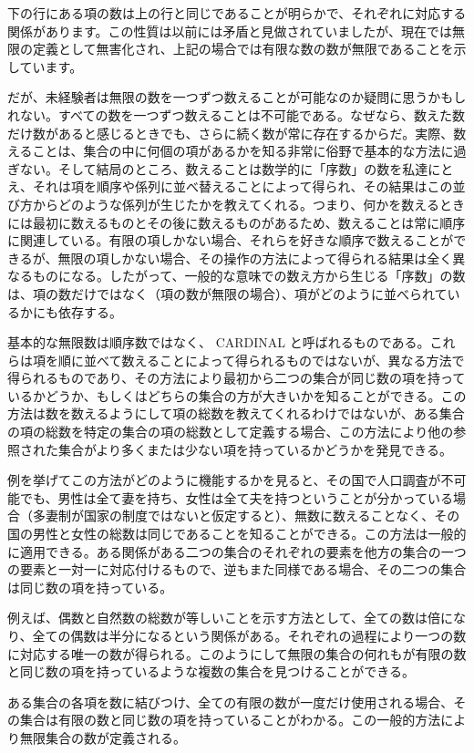 \documentclass[a4paper,11pt,openany]{ltjsbook}
\begin{document}
下の行にある項の数は上の行と同じであることが明らかで、それぞれに対応する関係があります。この性質は以前には矛盾と見做されていましたが、現在では無限の定義として無害化され、上記の場合では有限な数の数が無限であることを示しています。

だが、未経験者は無限の数を一つずつ数えることが可能なのか疑問に思うかもしれない。すべての数を一つずつ数えることは不可能である。なぜなら、数えた数だけ数があると感じるときでも、さらに続く数が常に存在するからだ。実際、数えることは、集合の中に何個の項があるかを知る非常に俗野で基本的な方法に過ぎない。そして結局のところ、数えることは数学的に「序数」の数を私達にとえ、それは項を順序や係列に並べ替えることによって得られ、その結果はこの並び方からどのような係列が生じたかを教えてくれる。つまり、何かを数えるときには最初に数えるものとその後に数えるものがあるため、数えることは常に順序に関連している。有限の項しかない場合、それらを好きな順序で数えることができるが、無限の項しかない場合、その操作の方法によって得られる結果は全く異なるものになる。したがって、一般的な意味での数え方から生じる「序数」の数は、項の数だけではなく（項の数が無限の場合）、項がどのように並べられているかにも依存する。

基本的な無限数は順序数ではなく、 CARDINAL と呼ばれるものである。これらは項を順に並べて数えることによって得られるものではないが、異なる方法で得られるものであり、その方法により最初から二つの集合が同じ数の項を持っているかどうか、もしくはどちらの集合の方が大きいかを知ることができる。この方法は数を数えるようにして項の総数を教えてくれるわけではないが、ある集合の項の総数を特定の集合の項の総数として定義する場合、この方法により他の参照された集合がより多くまたは少ない項を持っているかどうかを発見できる。

例を挙げてこの方法がどのように機能するかを見ると、その国で人口調査が不可能でも、男性は全て妻を持ち、女性は全て夫を持つということが分かっている場合（多妻制が国家の制度ではないと仮定すると）、無数に数えることなく、その国の男性と女性の総数は同じであることを知ることができる。この方法は一般的に適用できる。ある関係がある二つの集合のそれぞれの要素を他方の集合の一つの要素と一対一に対応付けるもので、逆もまた同様である場合、その二つの集合は同じ数の項を持っている。

例えば、偶数と自然数の総数が等しいことを示す方法として、全ての数は倍になり、全ての偶数は半分になるという関係がある。それぞれの過程により一つの数に対応する唯一の数が得られる。このようにして無限の集合の何れもが有限の数と同じ数の項を持っているような複数の集合を見つけることができる。

ある集合の各項を数に結びつけ、全ての有限の数が一度だけ使用される場合、その集合は有限の数と同じ数の項を持っていることがわかる。この一般的方法により無限集合の数が定義される。
\end{document}
